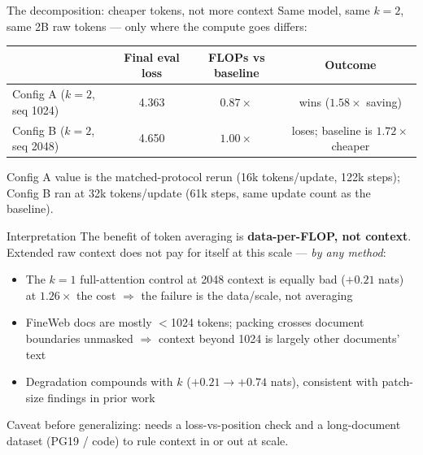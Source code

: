 \documentclass[10pt,aspectratio=169]{beamer}
\newcommand{\good}[1]{\textcolor{okgreen}{#1}}
\newcommand{\bad}[1]{\textcolor{warnred}{#1}}
\begin{document}
\begin{frame}{The decomposition: cheaper tokens, not more context}
  \footnotesize
  Same model, same $k{=}2$, same 2B raw tokens --- only where the compute goes
  differs:

  \vspace{0.4em}
  \centering
  \begin{tabular}{lccc}
    \toprule
    & Final eval loss & FLOPs vs baseline & Outcome \\
    \midrule
    Config A ($k{=}2$, seq 1024) & \good{4.363} & $0.87\times$ &
      \good{wins ($1.58\times$ saving)} \\
    Config B ($k{=}2$, seq 2048) & \bad{4.650} & $1.00\times$ &
      \bad{loses; baseline is $1.72\times$ cheaper} \\
    \bottomrule
  \end{tabular}

  \vspace{0.2em}
  \scriptsize Config A value is the matched-protocol rerun (16k
  tokens/update, 122k steps); Config B ran at 32k tokens/update (61k steps,
  same update count as the baseline).

  \vspace{0.4em}
  \raggedright
  \begin{block}{Interpretation}
    The benefit of token averaging is \textbf{data-per-FLOP, not context}.
    Extended raw context does not pay for itself at this scale ---
    \emph{by any method}:
    \begin{itemize}
      \item The $k{=}1$ full-attention control at 2048 context is equally bad
            ($+0.21$ nats) at $1.26\times$ the cost $\Rightarrow$ the failure
            is the data/scale, not averaging
      \item FineWeb docs are mostly $<$1024 tokens; packing crosses document
            boundaries unmasked $\Rightarrow$ context beyond 1024 is largely
            other documents' text
      \item Degradation compounds with $k$ ($+0.21 \to +0.74$ nats), consistent
            with patch-size findings in prior work
    \end{itemize}
  \end{block}

  \vspace{0.2em}
  \scriptsize Caveat before generalizing: needs a loss-vs-position check and a
  long-document dataset (PG19 / code) to rule context in or out at scale.
\end{frame}
\end{document}
